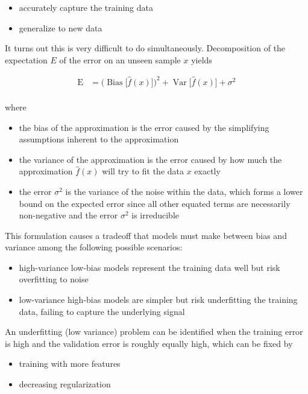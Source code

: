 \begin{itemize}
    \item accurately capture the training data
    \item generalize to new data
\end{itemize}

It turns out this is very difficult to do simultaneously. Decomposition of the expectation $E$ of the error on an unseen sample $x$ yields

$$
{\displaystyle {\begin{aligned}\operatorname {E} &={\Big (}\operatorname {Bias} {\big [}{\hat {f}}(x){\big ]}{\Big )}^{2}+\operatorname {Var} {\big [}{\hat {f}}(x){\big ]}+\sigma ^{2}\\\end{aligned}}}
$$

where

\begin{itemize}
    \item the bias of the approximation is the error caused by the simplifying assumptions inherent to the approximation
    \item the variance of the approximation is the error caused by how much the approximation $\hat{f}(x)$ will try to fit the data $x$ exactly
    \item the error $\sigma^2$ is the variance of the noise within the data, which forms a lower bound on the expected error since all other equated terms are necessarily non-negative and the error $\sigma^2$ is irreducible
\end{itemize}

This formulation causes a tradeoff that models must make between bias and variance among the following possible scenarios:

\begin{itemize}
    \item high-variance low-bias models represent the training data well but risk overfitting to noise
    \item low-variance high-bias models are simpler but risk underfitting the training data, failing to capture the underlying signal
\end{itemize}

An underfitting (low variance) problem can be identified when the training error is high and the validation error is roughly equally high, which can be fixed by

\begin{itemize}
    \item training with more features
    \item decreasing regularization
\end{itemize}

